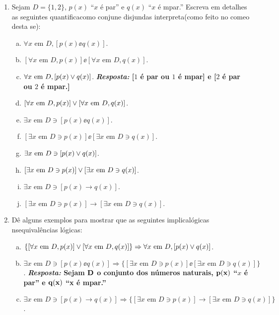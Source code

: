 \begin{enumerate}[{\bf 1.}]
\item Sejam $D=\{1,2\}$, $p(x)$ ``$x$ \'e par'' e $q(x)$ ``$x$ \'e \ih mpar.'' Escreva em detalhes as seguintes quantifica\coes como conjun\coes e disjun\coes  das interpreta\coes (como feito no come\cc o desta se\caoi):
\begin{enumerate}[a)]
\item $\forall x \textrm{ em } D, [p(x)\ee q(x)]$.
\item $[\forall x \textrm{ em } D, p(x)]\ee[\forall x \textrm{ em } D, q(x)]$.
\item $\forall x \textrm{ em } D, [p(x)\vee q(x)]$. {\bf{\it Resposta:} [$1$ \'e par ou $1$ \'e \ih mpar] e [$2$ \'e par ou $2$ \'e \ih mpar.]}
\item $[\forall x \textrm{ em } D, p(x)]\vee[\forall x \textrm{ em } D, q(x)]$.
\item $\exists x \textrm{ em } D \ni [p(x)\ee q(x)]$.
\item $[\exists x \textrm{ em } D \ni p(x)]\ee[\exists x \textrm{ em } D \ni q(x)]$.
\item $\exists x \textrm{ em } D \ni [p(x)\vee q(x)]$.
\item $[\exists x \textrm{ em } D \ni p(x)]\vee[\exists x \textrm{ em } D \ni q(x)]$.
\item $\exists x \textrm{ em } D \ni [p(x)\to q(x)]$.
\item $[\exists x \textrm{ em } D \ni p(x)]\to[\exists x \textrm{ em } D \ni q(x)]$.
\end{enumerate}

\item D\^e alguns exemplos para mostrar que as seguintes implica\coes l\'ogicas n\ao s\ao equival\^encias l\'ogicas:
\begin{enumerate}[a)]
\item $\{[\forall x \textrm{ em } D, p(x)]\vee[\forall x \textrm{ em } D, q(x)]\}\Rightarrow \forall x \textrm{ em } D, [p(x)\vee q(x)]$.
\item $\exists x \textrm{ em } D \ni [p(x)\ee q(x)]\Rightarrow\{[\exists x \textrm{ em } D \ni p(x)]\ee[\exists x \textrm{ em } D \ni q(x)]\}$. {\bf{\it Resposta:} Sejam ${\bf D}$ o conjunto dos n\'umeros naturais, ${\bf p(x)}$ ``$x$ \'e par'' e ${\bf q(x)}$ ``x \'e \ih mpar.''}
\item $\exists x \textrm{ em } D \ni [p(x)\to q(x)]\Rightarrow\{[\exists x \textrm{ em } D \ni p(x)]\to[\exists x \textrm{ em } D \ni q(x)]\}$.
\end{enumerate}


\end{enumerate}
